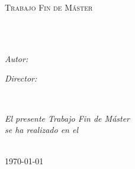 \documentclass[
11pt, %
spanish, %
singlespacing, %
headsepline, %
]{MastersDoctoralThesis} %
\begin{document}
\begin{titlepage}
\begin{center}

\vspace*{.06\textheight}
{\scshape\LARGE \univname\par}\vspace{1.5cm} %
\textsc{\Large Trabajo Fin de Máster}\\[0.5cm] %

\HRule \\[0.4cm] %
{\huge \bfseries \ttitle\par}\vspace{0.4cm} %
\HRule \\[1.5cm] %
 
\begin{minipage}[t]{0.4\textwidth}
\begin{flushleft} \large
\emph{Autor:}\\
\href{http://www.nuberoja.com}{\authorname} %
\end{flushleft}
\end{minipage}
\begin{minipage}[t]{0.4\textwidth}
\begin{flushright} \large
\emph{Director:} \\
\href{https://www.ehu.eus/es/web/gded/koldo}{\supname} %
\end{flushright}
\end{minipage}\\[3cm]
 
\vfill

\large \textit{El presente Trabajo Fin de Máster}\\[0.3cm] %
\textit{se ha realizado en el}\\[0.4cm]
\groupname\\[2cm] %
 
\vfill

{\large \today}\\[4cm] %
 
\vfill
\end{center}
\end{titlepage}

\let\cleardoublepage\clearpage 
\end{document}
